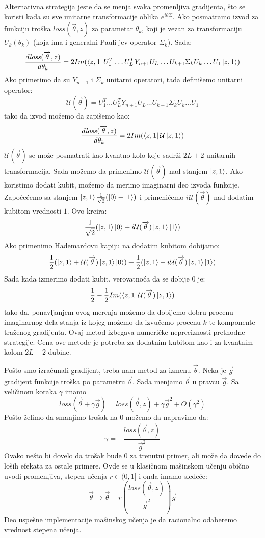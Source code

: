 \documentclass[12pt, letterpaper, oneside]{article}
\begin{document}
Alternativna strategija jeste da se menja svaka promenljiva gradijenta, što se koristi kada su sve unitarne transformacije oblika $e^{i\theta\Sigma}$.
Ako posmatramo izvod za funkciju troška $\mathit{loss}(\overrightarrow{\theta},z)$ za parametar $\theta_k$, koji je vezan za transformaciju $U_k(\theta_k)$
(koja ima i generalni Pauli-jev operator $\Sigma_k$). Sada:
\[
    \frac{d\mathit{loss}(\overrightarrow{\theta},z)}{d\theta_k} = 2Im(\Bra{z,1}U_1^T \dots U_L^TY_{n+1}U_L \dots U_{k+1} \Sigma_k U_k \dots U_1 \Ket{z,1})
\]
Ako primetimo da su $Y_{n+1}$ i $\Sigma_k$ unitarni operatori, tada definišemo unitarni operator:
\[
    \mathcal{U}(\overrightarrow{\theta}) = U_1^T \dots U_L^TY_{n+1}U_L \dots U_{k+1} \Sigma_k U_k \dots U_1
\]
tako da izvod možemo da zapišemo kao:
\[
    \frac{d\mathit{loss}(\overrightarrow{\theta},z)}{d\theta_k} = 2Im(\Bra{z,1}\mathcal{U}\Ket{z,1})
\]
$\mathcal{U}(\overrightarrow{\theta})$ se može posmatrati kao kvantno kolo koje sadrži $2L+2$ unitarnih transformacija.
Sada možemo da primenimo $\mathcal{U}(\overrightarrow{\theta})$ nad stanjem $\Ket{z,1}$. Ako koristimo dodati kubit, možemo da merimo imaginarni deo
izvoda funkcije. Započećemo sa stanjem $\Ket{z,1}\frac{1}{\sqrt{2}}(\Ket{0}+\Ket{1})$ i primenićemo $i\mathcal{U}(\overrightarrow{\theta})$ nad dodatim kubitom vrednosti $1$.
Ovo kreira:
\[
    \frac{1}{\sqrt{2}}(\Ket{z,1}\Ket{0} + i\mathcal{U}(\overrightarrow{\theta})\Ket{z,1}\Ket{1})
\]
Ako primenimo Hademardovu kapiju na dodatim kubitom dobijamo:
\[
    \frac{1}{2}(\Ket{z,1}+\mathcal{U}(\overrightarrow{\theta})\Ket{z,1}\Ket{0}) + \frac{1}{2}(\Ket{z,1}-i\mathcal{U}(\overrightarrow{\theta})\Ket{z,1}\Ket{1})
\]
Sada kada izmerimo dodati kubit, verovatnoća da se dobije $0$ je:
\[
    \frac{1}{2} - \frac{1}{2}Im(\bra{z,1}\mathcal{U}(\overrightarrow{\theta})\Ket{z,1})
\]
tako da, ponavljanjem ovog merenja možemo da dobijemo dobru procenu imaginarnog dela stanja iz kojeg možemo da izvučemo procenu $k$-te komponente traženog gradijenta.
Ovaj metod izbegava numeričke nepreciznosti prethodne strategije. Cena ove metode je potreba za dodatnim kubitom kao i za kvantnim kolom $2L+2$ dubine.

Pošto smo izračunali gradijent, treba nam metod za izmenu $\overrightarrow{\theta}$. Neka je $\overrightarrow{g}$ gradijent funkcije troška po parametru $\overrightarrow{\theta}$.
Sada menjamo $\overrightarrow{\theta}$ u pravcu $\overrightarrow{g}$. Sa veličinom koraka $\gamma$ imamo
\[
    \mathit{loss}(\overrightarrow{\theta}+\gamma \overrightarrow{g}) = \mathit{loss}(\overrightarrow{\theta},z)+ \gamma \overrightarrow{g}^2 + O(\gamma^2)
\]
Pošto želimo da smanjimo trošak na $0$ možemo da napravimo da:
\[
    \gamma = -\frac{\mathit{loss}(\overrightarrow{\theta},z)}{\overrightarrow{g}^2}
\]
Ovako nešto bi dovelo da trošak bude $0$ za trenutni primer, ali može da dovede do loših efekata za ostale primere.
Ovde se u klasičnom mašinskom učenju obično uvodi promenljiva, stepen učenja $r \in (0,1]$ i onda imamo sledeće:
\[
    \overrightarrow{\theta} \to \overrightarrow{\theta} - r(\frac{\mathit{loss}(\overrightarrow{\theta},z)}{\overrightarrow{g}^2})\overrightarrow{g}
\]
Deo uspešne implementacije mašinskog učenja je da racionalno odaberemo vrednost stepena učenja.
\end{document}
